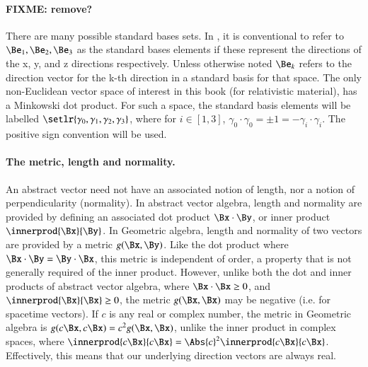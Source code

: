 \paragraph{FIXME: remove?}
There are many possible standard bases sets.  In , it is conventional to refer to \( \Be_1, \Be_2, \Be_3 \) as the standard bases elements if these represent the directions of the x, y, and z directions respectively.  Unless otherwise noted \( \Be_k \) refers to the direction vector for the k-th direction in a standard basis for that space.
The only non-Euclidean vector space of interest in this book (for relativistic material), has a Minkowski dot product.  For such a space, the standard basis elements will be labelled \( \setlr{ \gamma_0, \gamma_1, \gamma_2, \gamma_3 } \), where for \( i \in [1,3] \), \( \gamma_0 \cdot \gamma_0 = \pm 1 = -\gamma_i \cdot \gamma_i \).  The positive sign convention will be used.

%

\paragraph{The metric, length and normality.}

An abstract vector need not have an associated notion of length, nor a notion of perpendicularity (normality).
In abstract vector algebra, length and normality are provided by defining an associated dot product \(\Bx \cdot \By\), or inner product \(\innerprod{\Bx}{\By}\).
In Geometric algebra, length and normality of two vectors are provided by a metric \(g(\Bx, \By)\).
Like the dot product where \( \Bx \cdot \By = \By \cdot \Bx\), this metric is independent of order, a property that is not generally required of the inner product.
However, unlike both the dot and inner products of abstract vector algebra, where \( \Bx \cdot \Bx \ge 0\), and \( \innerprod{\Bx}{\Bx} \ge 0\), the metric \(g(\Bx, \Bx)\) may be negative (i.e. for spacetime vectors).
If \(c \) is any real or complex number, the metric in Geometric algebra is \( g(c \Bx, c \Bx) = c^2 g(\Bx, \Bx)\), unlike the inner product in complex spaces, where \( \innerprod{c \Bx}{c \Bx} = \Abs{c}^2 \innerprod{c \Bx}{c \Bx} \).
Effectively, this means that our underlying direction vectors are always real.


